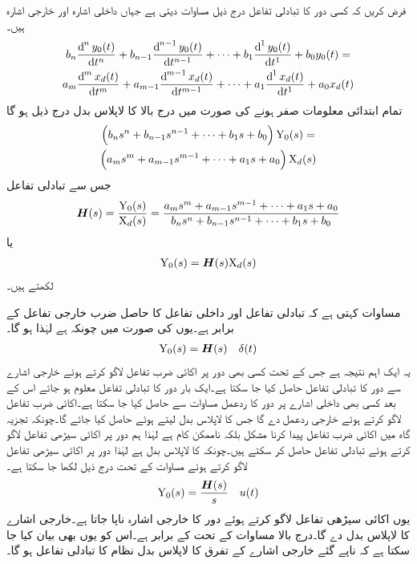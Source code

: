فرض کریں کہ کسی دور کا تبادلی تفاعل درج ذیل مساوات دیتی ہے جہاں  داخلی اشارہ اور  خارجی اشارہ ہیں۔
\begin{multline*}
b_n\frac{\dif^{\, n} y_0(t)}{\dif t^{n}}+b_{n-1}\frac{\dif^{\, n-1} y_0(t)}{\dif t^{n-1}}+\cdots+b_{1}\frac{\dif^{\, 1} y_0(t)}{\dif t^{1}}+b_0 y_0(t)=\\
a_m\frac{\dif^{\, m} x_d(t)}{\dif t^{m}}+a_{m-1}\frac{\dif^{\, m-1} x_d(t)}{\dif t^{m-1}}+\cdots+a_{1}\frac{\dif^{\, 1} x_d(t)}{\dif t^{1}}+a_0 x_d(t)
\end{multline*}
تمام ابتدائی معلومات صفر ہونے کی صورت میں درج بالا کا لاپلاس بدل درج ذیل ہو گا
\begin{multline*}
\left(b_n s^n+b_{n-1}s^{n-1}+\cdots +b_1 s+b_0\right){{{\textup{Y}}}_0(s)}=\\
\left(a_m s^m+a_{m-1}s^{m-1}+\cdots+a_1 s+a_0\right){{{\textup{X}}}_d(s)}
\end{multline*}
جس سے تبادلی تفاعل  
\begin{align*}
{\ensuremath{{\boldsymbol{H}}}}(s)=\frac{{{\textup{Y}}}_0(s)}{{{\textup{X}}}_d(s)}=\frac{a_m s^m+a_{m-1}s^{m-1}+\cdots+a_1 s+a_0}{b_n s^n+b_{n-1}s^{n-1}+\cdots +b_1 s+b_0}
\end{align*}
یا
\begin{align}\label{مساوات_لاپلاس_استعمال_عمومی_الف}
{{\ensuremath{{\textup{Y}}}}_0(s)}={{\boldsymbol{H}}}(s){{{\textup{X}}}_d(s)}
\end{align}
لکھتے ہیں۔

مساوات  کہتی ہے کہ تبادلی تفاعل  اور داخلی تفاعل  کا حاصل ضرب خارجی
 تفاعل  کے برابر ہے۔یوں  کی صورت میں چونکہ  ہے لہٰذا  ہو گا۔
\begin{align}\label{مساوات_لاپلاس_استعمال_تبادلی_تفاعل_اور_خارجی_اشارہ}
{{\ensuremath{{\textup{Y}}}}_0(s)}={{\boldsymbol{H}}}(s)\quad  \delta(t)
\end{align}
یہ ایک اہم نتیجہ ہے جس کے تحت کسی بھی دور پر اکائی ضرب تفاعل لاگو کرتے ہوئے خارجی اشارے سے دور کا تبادلی تفاعل حاصل کیا جا سکتا ہے۔ایک بار دور کا تبادلی تفاعل معلوم ہو جائے اس کے بعد کسی بھی داخلی اشارے پر دور کا ردعمل مساوات  سے حاصل کیا جا سکتا ہے۔اکائی ضرب تفاعل لاگو کرتے ہوئے خارجی ردعمل  دے گا جس کا لاپلاس بدل لیتے ہوئے  حاصل کیا جائے گا۔چونکہ تجزیہ گاہ میں اکائی ضرب تفاعل پیدا کرنا مشکل بلکہ ناممکن کام ہے لہٰذا ہم دور پر اکائی سیڑھی تفاعل لاگو کرتے ہوئے تبادلی تفاعل حاصل کر سکتے ہیں۔چونکہ  کا لاپلاس بدل  ہے لہٰذا دور پر اکائی سیڑھی تفاعل لاگو کرتے ہوئے مساوات  کے تحت درج ذیل لکھا جا سکتا ہے۔
\begin{align}
{{\ensuremath{{\textup{Y}}}}_0(s)}=\frac{{{\boldsymbol{H}}}(s)}{s} \quad u(t)
\end{align}
یوں اکائی سیڑھی تفاعل لاگو کرتے ہوئے دور کا خارجی اشارہ  ناپا جاتا ہے۔خارجی اشارے کا لاپلاس بدل  دے گا۔درج بالا مساوات کے تحت  کے برابر ہے۔اس کو یوں بھی بیان کیا جا سکتا ہے کہ ناپے گئے خارجی اشارے کے تفرق  کا لاپلاس بدل نظام کا تبادلی تفاعل  ہو گا۔

